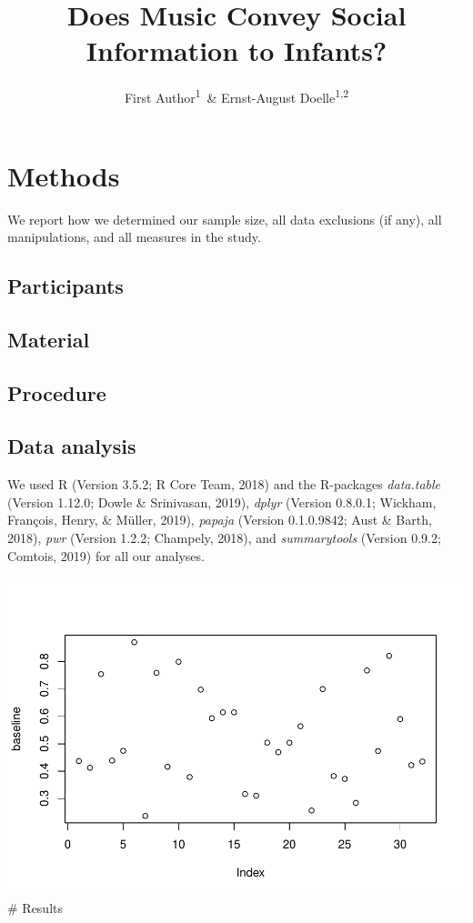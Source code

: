 \documentclass[man]{apa6}
\title{Does Music Convey Social Information to Infants?}
\author{First Author\textsuperscript{1}~\& Ernst-August
Doelle\textsuperscript{1,2}}
\date{}
\affiliation{
\vspace{0.5cm}
\textsuperscript{1} Wilhelm-Wundt-University\\\textsuperscript{2} Konstanz Business School}
\begin{document}
\maketitle

\section{Methods}\label{methods}

We report how we determined our sample size, all data exclusions (if
any), all manipulations, and all measures in the study.

\subsection{Participants}\label{participants}

\subsection{Material}\label{material}

\subsection{Procedure}\label{procedure}

\subsection{Data analysis}\label{data-analysis}

We used R (Version 3.5.2; R Core Team, 2018) and the R-packages
\emph{data.table} (Version 1.12.0; Dowle \& Srinivasan, 2019),
\emph{dplyr} (Version 0.8.0.1; Wickham, François, Henry, \& Müller,
2019), \emph{papaja} (Version 0.1.0.9842; Aust \& Barth, 2018),
\emph{pwr} (Version 1.2.2; Champely, 2018), and \emph{summarytools}
(Version 0.9.2; Comtois, 2019) for all our analyses.

\includegraphics{Midterm_files/figure-latex/unnamed-chunk-5-1.pdf} \#
Results
\end{document}
